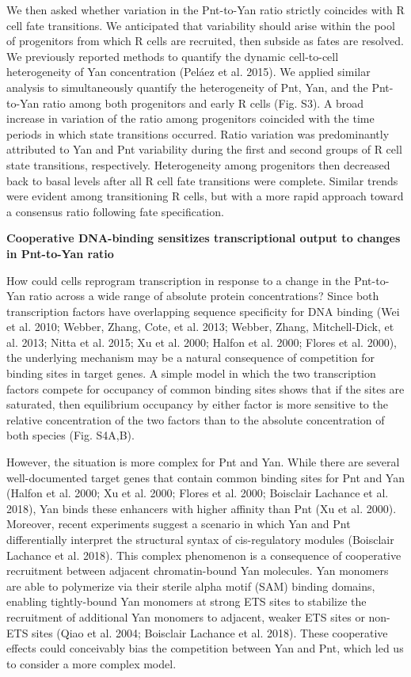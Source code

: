 We then asked whether variation in the Pnt-to-Yan ratio strictly coincides with R cell fate transitions. We anticipated that variability should arise within the pool of progenitors from which R cells are recruited, then subside as fates are resolved. We previously reported methods to quantify the dynamic cell-to-cell heterogeneity of Yan concentration (Peláez et al. 2015). We applied similar analysis to simultaneously quantify the heterogeneity of Pnt, Yan, and the Pnt-to-Yan ratio among both progenitors and early R cells (Fig. S3). A broad increase in variation of the ratio among progenitors coincided with the time periods in which state transitions occurred. Ratio variation was predominantly attributed to Yan and Pnt variability during the first and second groups of R cell state transitions, respectively. Heterogeneity among progenitors then decreased back to basal levels after all R cell fate transitions were complete. Similar trends were evident among transitioning R cells, but with a more rapid approach toward a consensus ratio following fate specification.

\textbf{Cooperative DNA-binding sensitizes transcriptional output to changes in Pnt-to-Yan ratio }

How could cells reprogram transcription in response to a change in the Pnt-to-Yan ratio across a wide range of absolute protein concentrations? Since both transcription factors have overlapping sequence specificity for DNA binding (Wei et al. 2010; Webber, Zhang, Cote, et al. 2013; Webber, Zhang, Mitchell-Dick, et al. 2013; Nitta et al. 2015; Xu et al. 2000; Halfon et al. 2000; Flores et al. 2000), the underlying mechanism may be a natural consequence of competition for binding sites in target genes. A simple model in which the two transcription factors compete for occupancy of common binding sites shows that if the sites are saturated, then equilibrium occupancy by either factor is more sensitive to the relative concentration of the two factors than to the absolute concentration of both species (Fig. S4A,B).

However, the situation is more complex for Pnt and Yan. While there are several well-documented target genes that contain common binding sites for Pnt and Yan (Halfon et al. 2000; Xu et al. 2000; Flores et al. 2000; Boisclair Lachance et al. 2018), Yan binds these enhancers with higher affinity than Pnt (Xu et al. 2000). Moreover, recent experiments suggest a scenario in which Yan and Pnt differentially interpret the structural syntax of cis-regulatory modules (Boisclair Lachance et al. 2018). This complex phenomenon is a consequence of cooperative recruitment between adjacent chromatin-bound Yan molecules. Yan monomers are able to polymerize via their sterile alpha motif (SAM) binding domains, enabling tightly-bound Yan monomers at strong ETS sites to stabilize the recruitment of additional Yan monomers to adjacent, weaker ETS sites or non-ETS sites (Qiao et al. 2004; Boisclair Lachance et al. 2018). These cooperative effects could conceivably bias the competition between Yan and Pnt, which led us to consider a more complex model.

